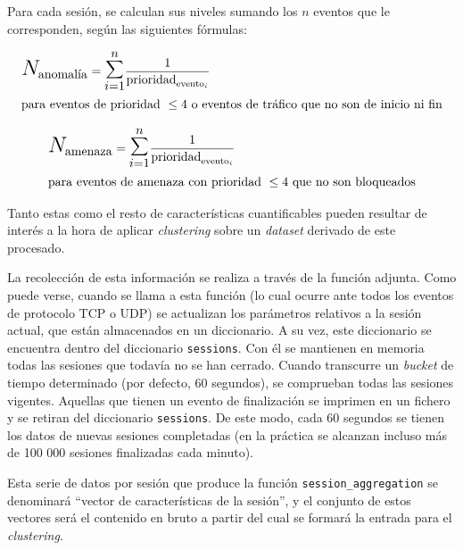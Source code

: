 Para cada sesión, se calculan sus niveles sumando los \(n\) eventos que le corresponden, según las siguientes fórmulas:

\begin{eqnarray*}
    & \mathlarger{\mathlarger{\mathlarger{N}}}_{\textrm{anomalía}} = \mathlarger{\mathlarger{\mathlarger{\sum}}}_{i=1}^{n} \frac{1}{\textrm{prioridad}_{\textrm{evento}_i}}\\
    & \textrm{para eventos de prioridad }\leq4\textrm{ o eventos de tráfico que no son de inicio ni fin}
\end{eqnarray*}

\begin{eqnarray*}
    & \mathlarger{\mathlarger{\mathlarger{N}}}_{\textrm{amenaza}} = \mathlarger{\mathlarger{\mathlarger{\sum}}}_{i=1}^{n} \frac{1}{\textrm{prioridad}_{\textrm{evento}_i}}\\
    & \textrm{para eventos de amenaza con prioridad }\leq4\textrm{ que no son bloqueados}
\end{eqnarray*}

Tanto estas como el resto de características cuantificables pueden resultar de interés a la hora de aplicar \emph{clustering} sobre un \emph{dataset} derivado de este procesado.

La recolección de esta información se realiza a través de la función adjunta.
Como puede verse, cuando se llama a esta función (lo cual ocurre ante todos los eventos de protocolo TCP o UDP)
se actualizan los parámetros relativos a la sesión actual, que están almacenados en un diccionario.
A su vez, este diccionario se encuentra dentro del diccionario \texttt{sessions}.
Con él se mantienen en memoria todas las sesiones que todavía no se han cerrado.
Cuando transcurre un \emph{bucket} de tiempo determinado (por defecto, 60 segundos), se comprueban todas las sesiones vigentes.
Aquellas que tienen un evento de finalización se imprimen en un fichero y se retiran del diccionario \texttt{sessions}.
De este modo, cada 60 segundos se tienen los datos de nuevas sesiones completadas (en la práctica se alcanzan incluso más de 100 000 sesiones finalizadas cada minuto).

Esta serie de datos por sesión que produce la función \texttt{session\_aggregation} se denominará ``vector de características de la sesión'', y el conjunto de estos vectores será el contenido en bruto a partir del cual se formará la entrada para el \emph{clustering}.

